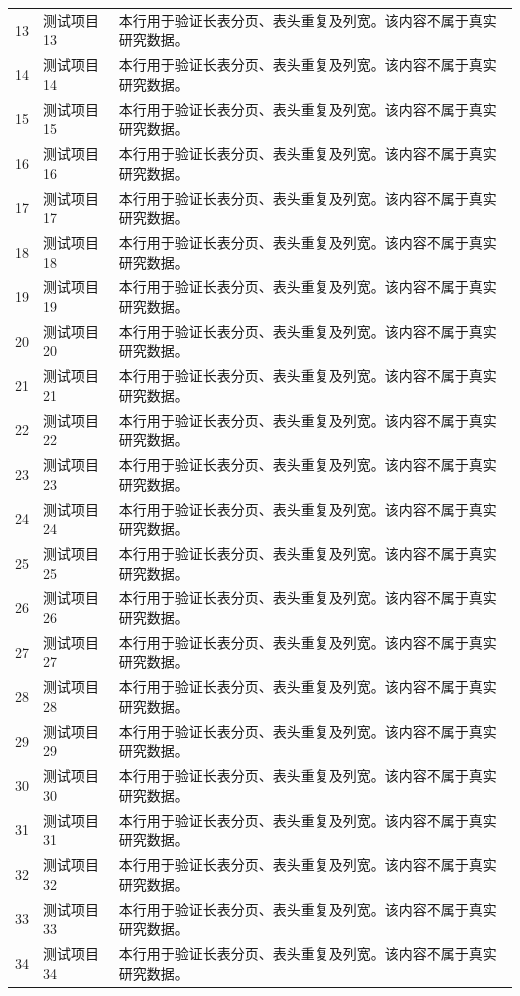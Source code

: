 \documentclass{whcthesis}
\begin{document}
\begin{longtable}{@{}p{.13\linewidth}p{.29\linewidth}p{}@{}}
13&测试项目13&本行用于验证长表分页、表头重复及列宽。该内容不属于真实研究数据。\\
14&测试项目14&本行用于验证长表分页、表头重复及列宽。该内容不属于真实研究数据。\\
15&测试项目15&本行用于验证长表分页、表头重复及列宽。该内容不属于真实研究数据。\\
16&测试项目16&本行用于验证长表分页、表头重复及列宽。该内容不属于真实研究数据。\\
17&测试项目17&本行用于验证长表分页、表头重复及列宽。该内容不属于真实研究数据。\\
18&测试项目18&本行用于验证长表分页、表头重复及列宽。该内容不属于真实研究数据。\\
19&测试项目19&本行用于验证长表分页、表头重复及列宽。该内容不属于真实研究数据。\\
20&测试项目20&本行用于验证长表分页、表头重复及列宽。该内容不属于真实研究数据。\\
21&测试项目21&本行用于验证长表分页、表头重复及列宽。该内容不属于真实研究数据。\\
22&测试项目22&本行用于验证长表分页、表头重复及列宽。该内容不属于真实研究数据。\\
23&测试项目23&本行用于验证长表分页、表头重复及列宽。该内容不属于真实研究数据。\\
24&测试项目24&本行用于验证长表分页、表头重复及列宽。该内容不属于真实研究数据。\\
25&测试项目25&本行用于验证长表分页、表头重复及列宽。该内容不属于真实研究数据。\\
26&测试项目26&本行用于验证长表分页、表头重复及列宽。该内容不属于真实研究数据。\\
27&测试项目27&本行用于验证长表分页、表头重复及列宽。该内容不属于真实研究数据。\\
28&测试项目28&本行用于验证长表分页、表头重复及列宽。该内容不属于真实研究数据。\\
29&测试项目29&本行用于验证长表分页、表头重复及列宽。该内容不属于真实研究数据。\\
30&测试项目30&本行用于验证长表分页、表头重复及列宽。该内容不属于真实研究数据。\\
31&测试项目31&本行用于验证长表分页、表头重复及列宽。该内容不属于真实研究数据。\\
32&测试项目32&本行用于验证长表分页、表头重复及列宽。该内容不属于真实研究数据。\\
33&测试项目33&本行用于验证长表分页、表头重复及列宽。该内容不属于真实研究数据。\\
34&测试项目34&本行用于验证长表分页、表头重复及列宽。该内容不属于真实研究数据。\\

\end{longtable}
\end{document}

